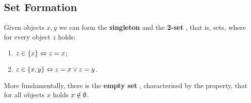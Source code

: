 \documentclass[12pt]{book}
\begin{document}
\subsection{Set Formation}
\label{sec:setformation}

Given objects $x, y$ we can form the \textbf{singleton}  and the \textbf{2-set} , that is, sets, where for every object $z$ holds:
\begin{enumerate}
\item $z \in \{ x \} \Leftrightarrow z = x$;
\item $z \in \{ x,y \} \Leftrightarrow z = x \vee z = y$.
\end{enumerate}

More fundamentally, there is the \textbf{empty set} \bmm{\es}, characterised by the property, that for all objects $x$ holds $x \notin \emptyset$.
\end{document}
